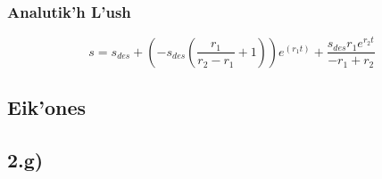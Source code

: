 \documentclass[a4paper]{article}
\begin{document}
        \subsubsection{Analutik'h L'ush}
        \[s=s_{des}+(-s_{des}(\frac{r_1}{r_2-r_1}+1))e^(r_1t)+\frac{s_{des}r_1e^{r_2t}}{-r_1+r_2}\]


        \subsection{Eik'ones}
        \subsection{2.g)}
        \noindent{}
        \noindent{}
\end{document}
